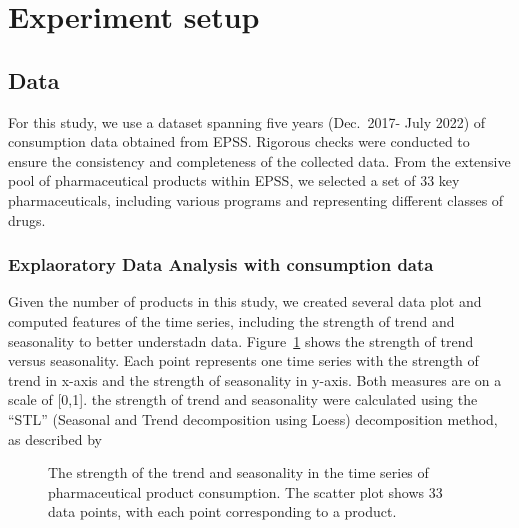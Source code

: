 \documentclass[
  authoryear,
  preprint,
  3p]{elsarticle}
\begin{document}
\section{Experiment setup}\label{sec-experiment}

\subsection{Data}\label{sec-data}

For this study, we use a dataset spanning five years (Dec.~2017- July
2022) of consumption data obtained from EPSS. Rigorous checks were
conducted to ensure the consistency and completeness of the collected
data. From the extensive pool of pharmaceutical products within EPSS, we
selected a set of 33 key pharmaceuticals, including various programs and
representing different classes of drugs.

\subsubsection{Explaoratory Data Analysis with consumption
data}\label{explaoratory-data-analysis-with-consumption-data}

Given the number of products in this study, we created several data plot
and computed features of the time series, including the strength of
trend and seasonality to better understadn data.
Figure~\ref{fig-feature} shows the strength of trend versus seasonality.
Each point represents one time series with the strength of trend in
x-axis and the strength of seasonality in y-axis. Both measures are on a
scale of {[}0,1{]}. the strength of trend and seasonality were
calculated using the ``STL'' (Seasonal and Trend decomposition using
Loess) decomposition method, as described by \citet{bandara2025mstl}

\begin{figure}


\caption{\label{fig-feature}The strength of the trend and seasonality in
the time series of pharmaceutical product consumption. The scatter plot
shows 33 data points, with each point corresponding to a product.}

\end{figure}%
\end{document}
